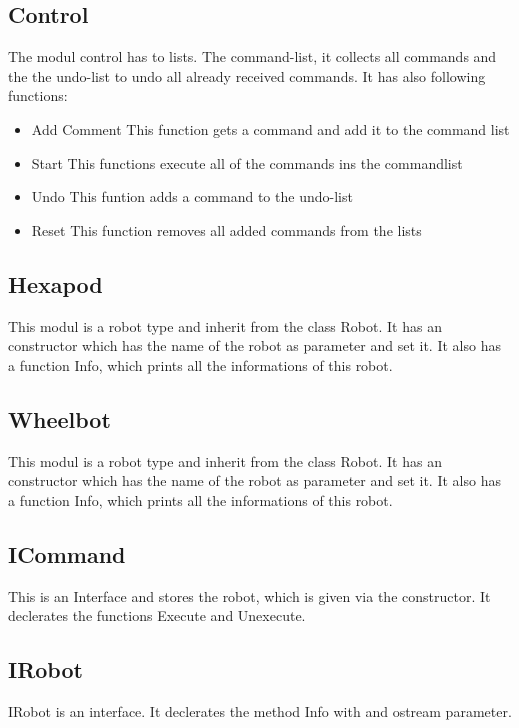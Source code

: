 \subsection{Control}
The modul control has to lists. The command-list, it collects all commands and the the undo-list to undo all already received commands.
It has also following functions:
\begin{itemize}
	\item Add Comment
	\subitem This function gets a command and add it to the command list
	\item Start
	\subitem This functions execute all of the commands ins the commandlist
	\item Undo
	\subitem This funtion adds a command to the undo-list
	\item Reset
	\subitem This function removes all added commands from the lists
\end{itemize}

\subsection{Hexapod}
This modul is a robot type and inherit  from the class Robot. It has an constructor which has the name of the robot as parameter and set it.
It also has a function Info, which prints all the informations of this robot.

\subsection{Wheelbot}
This modul is a robot type and inherit  from the class Robot. It has an constructor which has the name of the robot as parameter and set it.
It also has a function Info, which prints all the informations of this robot.

\subsection{ICommand}
This is an Interface and stores the robot, which is given via the constructor.
It declerates the functions Execute and Unexecute.

\subsection{IRobot}
IRobot is an interface. It declerates the method Info with and ostream parameter.


